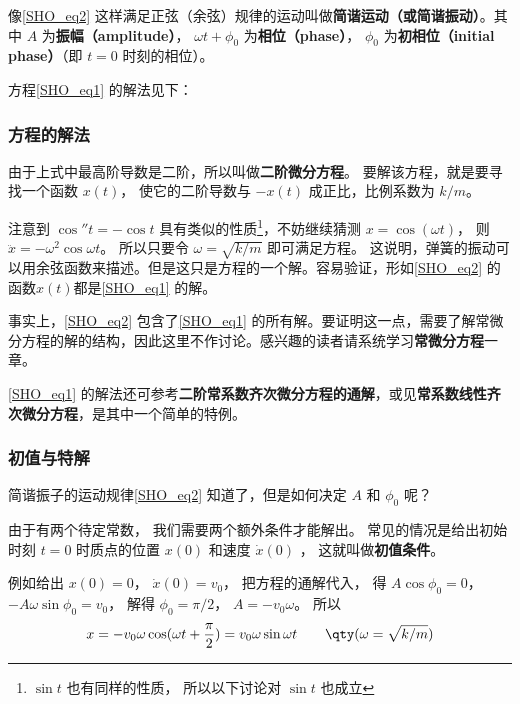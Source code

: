 像\autoref{SHO_eq2} 这样满足正弦（余弦）规律的运动叫做\textbf{简谐运动（或简谐振动）}。其中 $A$ 为\textbf{振幅（amplitude）}， $\omega t + \phi_0$ 为\textbf{相位（phase）}， $\phi_0$ 为\textbf{初相位（initial phase）}（即 $t = 0$ 时刻的相位）。 


方程\autoref{SHO_eq1} 的解法见下：



\subsubsection{方程的解法}

由于上式中最高阶导数是二阶，所以叫做\textbf{二阶微分方程}。 要解该方程，就是要寻找一个函数 $x(t)$， 使它的二阶导数与 $- x(t)$ 成正比，比例系数为 $k/m$。 

注意到 $\cos'' t =  - \cos t$ 具有类似的性质\footnote{$\sin t$ 也有同样的性质， 所以以下讨论对 $\sin t$ 也成立}，不妨继续猜测 $x = \cos(\omega t)$， 则 $\ddot x =  - {\omega ^2}\cos \omega t$。 所以只要令 $\omega = \sqrt{k/m}$ 即可满足方程。 这说明，弹簧的振动可以用余弦函数来描述。但是这只是方程的一个解。容易验证，形如\autoref{SHO_eq2} 的函数$x(t)$都是\autoref{SHO_eq1} 的解。

事实上，\autoref{SHO_eq2}  包含了\autoref{SHO_eq1}  的所有解。要证明这一点，需要了解常微分方程的解的结构，因此这里不作讨论。感兴趣的读者请系统学习\textbf{常微分方程}一章。

\autoref{SHO_eq1} 的解法还可参考\textbf{二阶常系数齐次微分方程的通解}，或见\textbf{常系数线性齐次微分方程}，是其中一个简单的特例。


\subsubsection{初值与特解}


简谐振子的运动规律\autoref{SHO_eq2} 知道了，但是如何决定 $A$ 和 $\phi_0$ 呢？ 

由于有两个待定常数， 我们需要两个额外条件才能解出。 常见的情况是给出初始时刻 $t = 0$ 时质点的位置 $x(0)$ 和速度 $\dot x(0)$ ， 这就叫做\textbf{初值条件}。

例如给出 $x(0) = 0$，  $\dot x(0) = v_0$， 把方程的通解代入， 得 $A\cos \phi_0 = 0$，  $ - A\omega \sin \phi_0 = v_0$， 解得 $\phi_0 = \pi /2$，  $A =  -v_0\omega $。 所以
\begin{equation}
x =  - v_0\omega \cos (\omega t + \frac{\pi }{2}) = v_0\omega \sin \omega t \qquad \qty(\omega  = \sqrt{k/m})
\end{equation}

